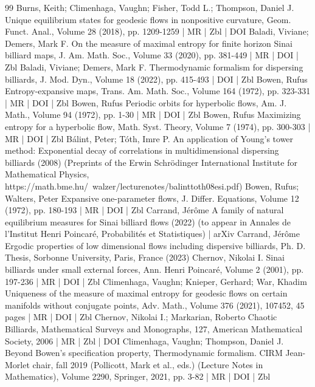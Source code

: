 \begin{thebibliography}{99}
Burns, Keith; Climenhaga, Vaughn; Fisher, Todd L.; Thompson, Daniel J. Unique equilibrium states for geodesic flows in nonpositive curvature, Geom. Funct. Anal., Volume 28 (2018), pp. 1209-1259 | MR | Zbl | DOI
Baladi, Viviane; Demers, Mark F. On the measure of maximal entropy for finite horizon Sinai billiard maps, J. Am. Math. Soc., Volume 33 (2020), pp. 381-449 | MR | DOI | Zbl
Baladi, Viviane; Demers, Mark F. Thermodynamic formalism for dispersing billiards, J. Mod. Dyn., Volume 18 (2022), pp. 415-493 | DOI | Zbl
Bowen, Rufus Entropy-expansive maps, Trans. Am. Math. Soc., Volume 164 (1972), pp. 323-331 | MR | DOI | Zbl
Bowen, Rufus Periodic orbits for hyperbolic flows, Am. J. Math., Volume 94 (1972), pp. 1-30 | MR | DOI | Zbl
Bowen, Rufus Maximizing entropy for a hyperbolic flow, Math. Syst. Theory, Volume 7 (1974), pp. 300-303 | MR | DOI | Zbl
Bálint, Peter; Tóth, Imre P. An application of Young’s tower method: Exponential decay of correlations in multidimensional dispersing billiards (2008) (Preprints of the Erwin Schrödinger International Institute for Mathematical Physics, https://math.bme.hu/~walzer/lecturenotes/balinttoth08esi.pdf)
Bowen, Rufus; Walters, Peter Expansive one-parameter flows, J. Differ. Equations, Volume 12 (1972), pp. 180-193 | MR | DOI | Zbl
Carrand, Jérôme A family of natural equilibrium measures for Sinai billiard flows (2022) (to appear in Annales de l’Institut Henri Poincaré, Probabilités et Statistiques) | arXiv
Carrand, Jérôme Ergodic properties of low dimensional flows including dispersive billiards, Ph. D. Thesis, Sorbonne University, Paris, France (2023)
Chernov, Nikolai I. Sinai billiards under small external forces, Ann. Henri Poincaré, Volume 2 (2001), pp. 197-236 | MR | DOI | Zbl
Climenhaga, Vaughn; Knieper, Gerhard; War, Khadim Uniqueness of the measure of maximal entropy for geodesic flows on certain manifolds without conjugate points, Adv. Math., Volume 376 (2021), 107452, 45 pages | MR | DOI | Zbl
Chernov, Nikolai I.; Markarian, Roberto Chaotic Billiards, Mathematical Surveys and Monographs, 127, American Mathematical Society, 2006 | MR | Zbl | DOI
Climenhaga, Vaughn; Thompson, Daniel J. Beyond Bowen’s specification property, Thermodynamic formalism. CIRM Jean-Morlet chair, fall 2019 (Pollicott, Mark et al., eds.) (Lecture Notes in Mathematics), Volume 2290, Springer, 2021, pp. 3-82 | MR | DOI | Zbl

\end{thebibliography}
